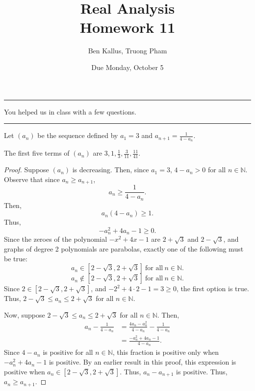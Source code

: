 \documentclass[12pt]{article}
\title{Real Analysis \\ Homework 11}
\author{Ben Kallus, Truong Pham}
\date{Due Monday, October 5}
\begin{document}
\maketitle

\hrule
\bigskip

 You helped us in class with a few questions.

\bigskip
\hrule
\bigskip

 Let $(a_n)$ be the sequence defined by $a_1 = 3$ and $a_{n+1} = \frac1{4-a_n}$.

\medskip
{} The first five terms of $(a_n)$ are $3, 1, \frac13, \frac3{11}, \frac{11}{41}$.

\newpage
{}
\begin{proof}
    Suppose $(a_n)$ is decreasing. Then, since $a_1 = 3$, $4-a_n > 0$ for all $n \in \mathbb N$.
    Observe that since $a_n \geq a_{n+1}$, $$a_n \geq \frac1{4-a_n}.$$
    Then, $$a_n(4 - a_n) \geq 1.$$
    Thus, $$-a_n^2 + 4a_n - 1 \geq 0.$$
    Since the zeroes of the polynomial $-x^2 + 4x - 1$ are $2 + \sqrt3$ and $2 - \sqrt3$, and graphs of degree 2 polynomials are parabolas, exactly one of the following must be true:
    $$a_n \in [2 - \sqrt3, 2 + \sqrt3]~\text{for all}~n \in \mathbb N.$$
    $$a_n \notin [2 - \sqrt3, 2 + \sqrt3]~\text{for all}~n \in \mathbb N.$$
    Since $2 \in [2 - \sqrt3, 2 + \sqrt3]$, and $-2^2 + 4\cdot2-1 = 3 \geq 0$, the first option is true. Thus, $2 - \sqrt3 \leq a_n \leq 2 + \sqrt3$ for all $n \in \mathbb N$.
    
    Now, suppose $2 - \sqrt3 \leq a_n \leq 2 + \sqrt3$ for all $n \in \mathbb N$.
    Then,
    \begin{align*}
        a_n - \frac{1}{4 - a_n} &= \frac{4a_n - a_n^2}{4 - a_n} - \frac1{4 - a_n} \\
                                &= \frac{-a_n^2+4a_n-1}{4 - a_n}.
    \end{align*}
    Since $4 - a_n$ is positive for all $n \in \mathbb N$, this fraction is positive only when $-a_n^2+4a_n-1$ is positive. By an earlier result in this proof, this expression is positive when $a_n \in [2 - \sqrt3, 2 + \sqrt3]$. Thus, $a_n - a_{n+1}$ is positive. Thus, $a_n \geq a_{n+1}$.
\end{proof}
\end{document}
